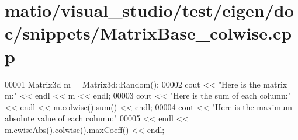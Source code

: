 \hypertarget{matio_2visual__studio_2test_2eigen_2doc_2snippets_2_matrix_base__colwise_8cpp_source}{}\section{matio/visual\+\_\+studio/test/eigen/doc/snippets/\+Matrix\+Base\+\_\+colwise.cpp}
\label{matio_2visual__studio_2test_2eigen_2doc_2snippets_2_matrix_base__colwise_8cpp_source}

\begin{DoxyCode}
00001 Matrix3d m = Matrix3d::Random();
00002 cout << \textcolor{stringliteral}{"Here is the matrix m:"} << endl << m << endl;
00003 cout << \textcolor{stringliteral}{"Here is the sum of each column:"} << endl << m.colwise().sum() << endl;
00004 cout << \textcolor{stringliteral}{"Here is the maximum absolute value of each column:"}
00005      << endl << m.cwiseAbs().colwise().maxCoeff() << endl;
\end{DoxyCode}
